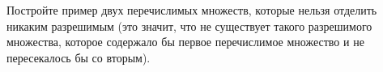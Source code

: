 Постройте пример двух перечислимых множеств, которые нельзя отделить никаким разрешимым (это значит, что не существует такого
разрешимого множества, которое содержало бы первое перечислимое множество и не пересекалось бы со вторым).